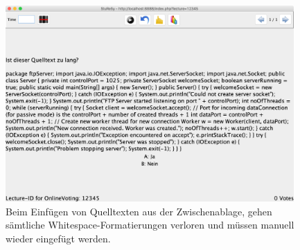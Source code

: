\begin{figure}[H]
    \includegraphics[width=11cm]{chapter/bewertung/bilder/StuReSy_Problem_3.png}
    \centering
    \caption{Beim Einfügen von Quelltexten aus der Zwischenablage, gehen sämtliche Whitespace-Formatierungen verloren und müssen manuell wieder eingefügt werden.}
    \label{Abbildung 2.4}
\end{figure}
